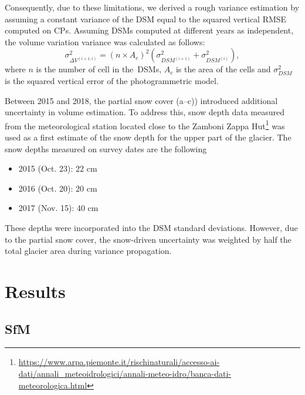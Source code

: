 Consequently, due to these limitations, we derived a rough variance estimation by
assuming a constant variance of the DSM equal to the squared vertical RMSE computed on CPs.
Assuming DSMs computed at different years as independent, the volume variation variance 
was calculated as follows:
\begin{equation}
    \sigma^2_{\Delta V^{(i+1,i)}}  = {(n \times A_c)}^2 \left( \sigma^2
    _{DSM^{(i+1)}} + \sigma^2_{DSM^{(i)}} \right),
    \label{eq:3:volVarProp}
\end{equation}
where $ n $ is the number of cell in the~DSMs, $A_c$ is the area of the cells
and $ \sigma^2 _{DSM}$ is the squared vertical error of the photogrammetric model.

Between 2015 and 2018, the partial snow cover (a--c)) introduced
additional uncertainty in volume estimation. 
To address this, snow depth data measured from the meteorological station located close 
to the Zamboni Zappa 
Hut\footnote{\mbox{\url{https://www.arpa.piemonte.it/rischinaturali/accesso-ai-dati/annali_meteoidrologici/annali-meteo-idro/banca-dati-meteorologica.html}}} 
was used as a first estimate of the snow depth for the upper part of the glacier. 
The snow depths measured on survey dates are the following
\begin{itemize}
    \item 2015 (Oct. 23): 22 cm
    \item 2016 (Oct. 20): 20 cm
    \item 2017 (Nov. 15): 40 cm
\end{itemize}
These depths were incorporated into the DSM standard deviations. 
However, due to the partial snow cover, the snow-driven uncertainty was weighted 
by half the total glacier area during variance propagation.

\section{Results}\label{sec:3:res}

\subsection{SfM}\label{sec:3:res:sfm}

